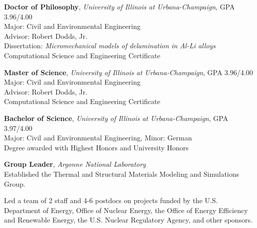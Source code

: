 \usepackage{ifthen}
\usepackage[sorting=ydnt,style=numeric,defernumbers]{biblatex}










\makecvtitle


\textbf{Doctor of Philosophy}, \emph{University of Illinois at Urbana-Champaign},
GPA 3.96/4.00\\
Major: Civil and Environmental Engineering\\
Advisor: Robert Dodds, Jr. \\
Dissertation: \textit{Micromechanical models of delamination in Al-Li
alloys}\\
Computational Science and Engineering Certificate

\textbf{Master of Science}, \emph{University of Illinois at Urbana-Champaign},
GPA 3.96/4.00 \\
Major: Civil and Environmental Engineering\\
Advisor: Robert Dodds, Jr. \\
Computational Science and Engineering Certificate

\textbf{Bachelor of Science}, \emph{University of Illinois at Urbana-Champaign},
GPA 3.97/4.00 \\
Major: Civil and Environmental Engineering, Minor: German\\
Degree awarded with Highest Honors and University Honors 


\textbf{Group Leader}, \emph{Argonne National Laboratory}
\\
Established the Thermal and Structural Materials Modeling and Simulations Group.

Led a team of 2 staff and 4-6 postdocs on projects funded by the U.S. Department of Energy, 
Office of Nuclear Energy, the Office of Energy Efficiency and Renewable Energy, the U.S. Nuclear Regulatory Agency,
and other sponsors.


